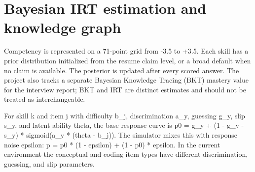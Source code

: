 \documentclass{ieeeaccess}
\begin{document}
\begin{table}[t]\centering\small

\caption{Table 1. Observation and action dimensions}


\end{table}

\section{Bayesian IRT estimation and knowledge graph}

Competency is represented on a 71-point grid from -3.5 to +3.5. Each skill has a prior distribution initialized from the resume claim level, or a broad default when no claim is available. The posterior is updated after every scored answer. The project also tracks a separate Bayesian Knowledge Tracing (BKT) mastery value for the interview report; BKT and IRT are distinct estimates and should not be treated as interchangeable.

For skill k and item j with difficulty b\_j, discrimination a\_y, guessing g\_y, slip s\_y, and latent ability theta, the base response curve is p0 = g\_y + (1 - g\_y - s\_y) * sigmoid(a\_y * (theta - b\_j)). The simulator mixes this with response noise epsilon: p = p0 * (1 - epsilon) + (1 - p0) * epsilon. In the current environment the conceptual and coding item types have different discrimination, guessing, and slip parameters.
\end{document}

